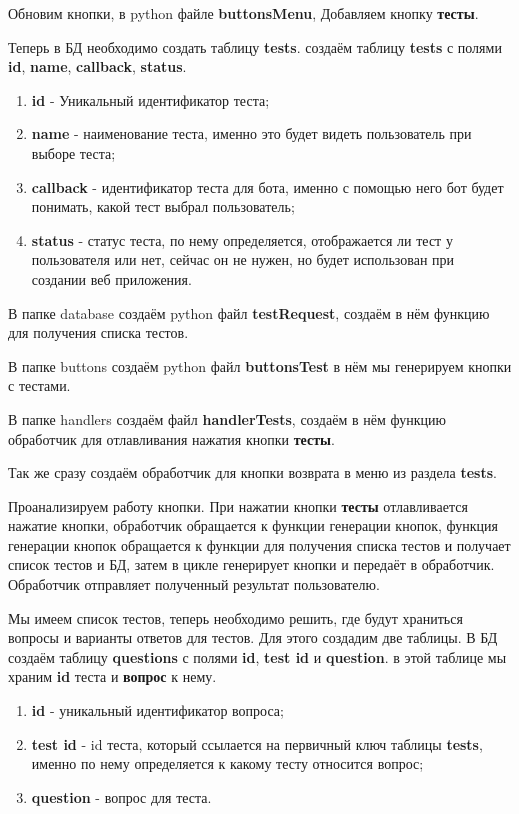 \documentclass[12pt, oldlfont, amsfonts]{report}
\begin{document}
Обновим кнопки, в python файле {\bf buttonsMenu}, Добавляем кнопку {\bf тесты}.

Теперь в БД необходимо создать таблицу {\bf tests}. создаём таблицу {\bf tests} с полями {\bf id}, {\bf name}, {\bf callback}, {\bf status}.

\begin{enumerate}
\item {\bf id} - Уникальный идентификатор теста;
\item {\bf name} - наименование теста, именно это будет видеть пользователь при выборе теста;
\item {\bf callback} - идентификатор теста для бота, именно с помощью него бот будет понимать, какой тест выбрал пользователь;
\item {\bf status} - статус теста, по нему определяется, отображается ли тест у пользователя или нет, сейчас он не нужен, но будет использован при создании веб приложения.
\end{enumerate}	


В папке database создаём python файл {\bf testRequest}, создаём в нём функцию для получения списка тестов.

В папке buttons создаём python файл {\bf buttonsTest} в нём мы генерируем кнопки с тестами.

В папке handlers создаём файл {\bf handlerTests}, создаём в нём функцию обработчик для отлавливания нажатия кнопки {\bf тесты}. 

Так же сразу создаём обработчик для кнопки возврата в меню из раздела {\bf tests}.

Проанализируем работу кнопки. При нажатии кнопки {\bf тесты} отлавливается нажатие кнопки, обработчик обращается к функции генерации кнопок, функция генерации кнопок обращается к функции для получения списка тестов и получает список тестов и БД, затем в цикле генерирует кнопки и передаёт в обработчик. Обработчик отправляет полученный результат пользователю.

Мы имеем список тестов, теперь необходимо решить, где будут храниться вопросы и варианты ответов для тестов. Для этого создадим две таблицы. В БД создаём таблицу {\bf questions} с полями {\bf id}, {\bf test id} и {\bf question}. в этой таблице мы храним {\bf id} теста и {\bf вопрос} к нему. 
\begin{enumerate}
\item {\bf id} - уникальный идентификатор вопроса;
\item {\bf test id} - id теста, который ссылается на первичный ключ таблицы {\bf tests}, именно по нему определяется к какому тесту относится вопрос;
\item {\bf question} - вопрос для теста.
\end{enumerate}	
\end{document}
